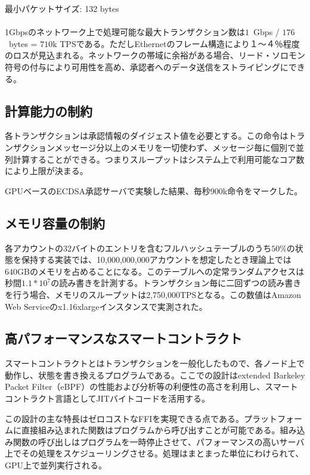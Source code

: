 \documentclass[12pt]{ltjsarticle}
\begin{document}
\noindent 最小パケットサイズ: 132 bytes \\\\

1Gbpsのネットワーク上で処理可能な最大トランザクション数は$1$~Gbps / $176$~bytes = $710$k TPSである。ただしEthernetのフレーム構造により１〜４％程度のロスが見込まれる。ネットワークの帯域に余裕がある場合、リード・ソロモン符号の付与により可用性を高め、承認者へのデータ送信をストライピングにできる。

\subsection{計算能力の制約}
各トランザクションは承認情報のダイジェスト値を必要とする。この命令はトランザクションメッセージ分以上のメモリを一切使わず、メッセージ毎に個別で並列計算することができる。つまりスループットはシステム上で利用可能なコア数により上限が決まる。

GPUベースのECDSA承認サーバで実験した結果、毎秒900k命令をマークした\cite{gpuecc}。

\subsection{メモリ容量の制約}
各アカウントの32バイトのエントリを含むフルハッシュテーブルのうち\(50\%\)の状態を保持する実装では、10,000,000,000アカウントを想定したとき理論上では640GBのメモリを占めることになる。このテーブルへの定常ランダムアクセスは秒間\(1.1 * 10^7\)の読み書きを計測する。トランザクション毎に二回ずつの読み書きを行う場合、メモリのスループットは2,750,000TPSとなる。この数値はAmazon Web Serviceのx1.16xlargeインスタンスで実測された。

\subsection{高パフォーマンスなスマートコントラクト}\label{sec:smartcontracts}
スマートコントラクトとはトランザクションを一般化したもので、各ノード上で動作し、状態を書き換えるプログラムである。ここでの設計はextended Barkeley Packet Filter（eBPF）の性能および分析等の利便性の高さを利用し、スマートコントラクト言語としてJITバイトコードを活用する。

この設計の主な特長はゼロコストなFFIを実現できる点である。プラットフォームに直接組み込まれた関数はプログラムから呼び出すことが可能である。組み込み関数の呼び出しはプログラムを一時停止させて、パフォーマンスの高いサーバ上でその処理をスケジューリングさせる。処理はまとまった単位にわけられて、GPU上で並列実行される。
\end{document}
